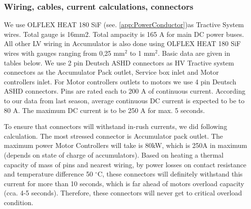 \subsubsection{Wiring, cables, current calculations, connectors}


We use OLFLEX HEAT 180 SiF (see. \ref{app:PowerConductor})as Tractive System wires. Total gauge is 16mm2. Total ampacity is 165 A for main DC power buses. All other LV wiring in Accumulator is also done using OLFLEX HEAT 180 SiF wires with gauges ranging from 0,25 mm$^2$ to 1 mm$^2$. Basic data are given in tables below. We use 2 pin Deutsch ASHD connectors as HV Tractive system connectors as the Accumulator Pack outlet, Service box inlet and Motor controllers inlet. For Motor controllers outlets to motors we use 4 pin Deutsch ASHD connectors. Pins are rated each to 200 A of continuous current. According to our data from last season, average continuous DC current is expected to be to 80 A. The maximum DC current is to be 250 A for max. 5 seconds.

To ensure that connectors will withstand in-rush currents, we did following calculation. The most stressed connector is Accumulator pack outlet. The maximum power Motor Controllers will take is 80kW, which is 250A in maximum (depends on state of charge of accumulators). Based on heating a thermal capacity of mass of pins and nearest wiring, by power losses on contact resistance and temperature difference 50 $^\circ$C, these connectors will definitely withstand this current for more than 10 seconds, which is far ahead of motors overload capacity (cca. 4-5 seconds). Therefore, these connectors will never get to critical overload condition.


